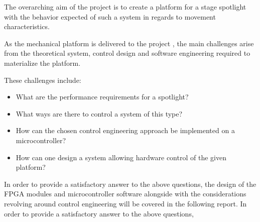 \documentclass[../../main]{subfiles}
\begin{document}
The overarching aim of the project is to create a platform for a stage spotlight with the behavior expected of such a system in regards to movement characteristics.

As the mechanical platform is delivered to the project , the main challenges arise from the theoretical system, control design and software engineering required to materialize the platform.

These challenges include:

\begin{itemize}
    \item What are the performance requirements for a spotlight?
    \item What ways are there to control a system of this type? 
    \item How can the chosen control engineering approach be implemented on a microcontroller? 
    \item How can one design a system allowing hardware control of the given platform? 
\end{itemize}

In order to provide a satisfactory answer to the above questions, the design of the FPGA modules and microcontroller software alongside with the considerations revolving around control engineering will be covered in the following report. 
In order to provide a satisfactory answer to the above questions,
\end{document}
